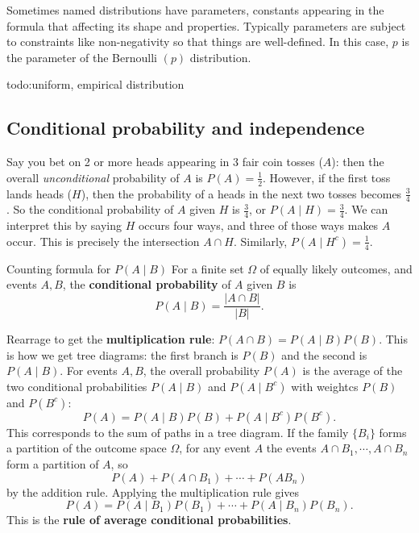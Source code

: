 Sometimes named distributions have parameters, constants appearing in the formula that affecting its shape and properties. Typically parameters are subject to constraints like non-negativity so that things are well-defined. In this case, $p$ is the parameter of the Bernoulli $(p)$ distribution.

{\color{red}todo:uniform, empirical distribution} 

\subsection{Conditional probability and independence}
Say you bet on 2 or more heads appearing in 3 fair coin tosses ($A$): then the overall \emph{unconditional} probability of $A$ is $P(A)=\frac{1}{2}$. However, if the first toss lands heads ($H$), then the probability of a heads in the next two tosses becomes $\frac{3}{4}$. So the conditional probability of $A$ given $H$ is $\frac{3}{4}$, or  $P(A \mid H)=\frac{3}{4}$. We can interpret this by saying $H$ occurs four ways, and three of those ways makes $A$ occur. This is precisely the intersection $A \cap H$. Similarly, $P(A \mid H^{c})=\frac{1}{4}$.

\begin{namedthing}{Counting formula for $P(A\mid B)$} 
    For a finite set $\Omega$ of equally likely outcomes, and events $A,B$, the \textbf{conditional probability} of $A$ given $B$ is \[
        P(A \mid B)= \frac{|A \cap B|}{|B|}.
    \] 
\end{namedthing}
Rearrage to get the \textbf{multiplication rule}: $P(A \cap B)=P(A \mid B)P(B)$. This is how we get tree diagrams: the first branch is $P(B)$ and the second is $P(A\mid B)$. For events $A,B$, the overall probability $P(A)$ is the average of the two conditional probabilities $P(A \mid B)$ and $P(A \mid B^{c})$ with weightcs $P(B)$ and $P(B^{c})$: \[
    P(A)=P(A \mid B)P(B)+P(A \mid B^{c})P(B^{c}).
\] This corresponds to the sum of paths in a tree diagram. If the family  $\{B_i \}$ forms a partition of the outcome space $\Omega$, for any event $A$ the events $A \cap B_1, \cdots ,A\cap B_n $ form a partition of $A$, so \[
P(A)+P(A \cap B_1) + \cdots + P(AB_n )
\] by the addition rule. Applying the multiplication rule gives \[
P(A)= P(A \mid B_1)P(B_1) + \cdots + P(A\mid B_n )P(B_n ).
\] This is the \textbf{rule of average conditional probabilities}. 

